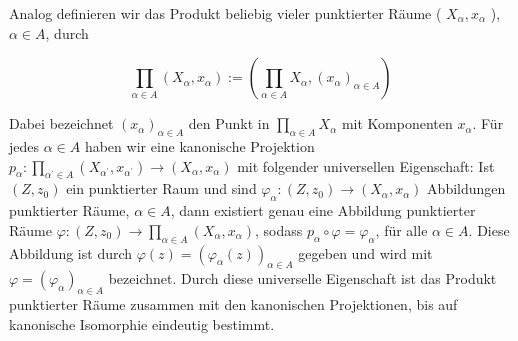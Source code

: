 \documentclass[10pt]{article}
\begin{document}
Analog definieren wir das Produkt beliebig vieler punktierter Räume ( $X_{\alpha}, x_{\alpha}$ ), $\alpha \in A$, durch

$$
\prod_{\alpha \in A}\left(X_{\alpha}, x_{\alpha}\right):=\left(\prod_{\alpha \in A} X_{\alpha},\left(x_{\alpha}\right)_{\alpha \in A}\right)
$$

Dabei bezeichnet $\left(x_{\alpha}\right)_{\alpha \in A}$ den Punkt in $\prod_{\alpha \in A} X_{\alpha}$ mit Komponenten $x_{\alpha}$. Für jedes $\alpha \in A$ haben wir eine kanonische Projektion $p_{\alpha}: \prod_{\alpha^{\prime} \in A}\left(X_{\alpha^{\prime}}, x_{\alpha^{\prime}}\right) \rightarrow\left(X_{\alpha}, x_{\alpha}\right)$ mit folgender universellen Eigenschaft: Ist $\left(Z, z_{0}\right)$ ein punktierter Raum und sind $\varphi_{\alpha}:\left(Z, z_{0}\right) \rightarrow\left(X_{\alpha}, x_{\alpha}\right)$ Abbildungen punktierter Räume, $\alpha \in A$, dann existiert genau eine Abbildung punktierter Räume $\varphi:\left(Z, z_{0}\right) \rightarrow \prod_{\alpha \in A}\left(X_{\alpha}, x_{\alpha}\right)$, sodass $p_{\alpha} \circ \varphi=\varphi_{\alpha}$, für alle $\alpha \in A$. Diese Abbildung ist durch $\varphi(z)=\left(\varphi_{\alpha}(z)\right)_{\alpha \in A}$ gegeben und wird mit $\varphi=\left(\varphi_{\alpha}\right)_{\alpha \in A}$ bezeichnet. Durch diese universelle Eigenschaft ist das Produkt punktierter Räume zusammen mit den kanonischen Projektionen, bis auf kanonische Isomorphie eindeutig bestimmt.
\end{document}
